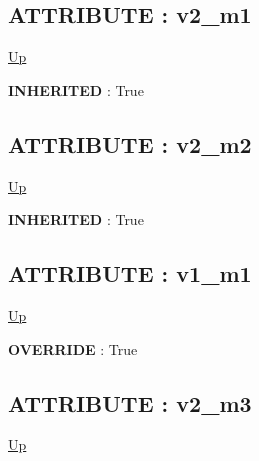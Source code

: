 \subsection*{ATTRIBUTE : v2\_m1}
\hypertarget{ecldoc:intest.inintest.example_2.mod_1.v2_m1}{}
\par
\begin{minipage}[t]{\textwidth}
\begin{flushleft}
  
\end{flushleft}
\end{minipage}
\hyperlink{ecldoc:intest.inintest.example_2.mod_3}{Up} \\
\par
\par
\textbf{INHERITED} : True \\
\subsection*{ATTRIBUTE : v2\_m2}
\hypertarget{ecldoc:intest.inintest.example_2.mod_2.v2_m2}{}
\par
\begin{minipage}[t]{\textwidth}
\begin{flushleft}
  
\end{flushleft}
\end{minipage}
\hyperlink{ecldoc:intest.inintest.example_2.mod_3}{Up} \\
\par
\par
\textbf{INHERITED} : True \\
\subsection*{ATTRIBUTE : v1\_m1}
\hypertarget{ecldoc:intest.inintest.example_2.mod_3.v1_m1}{}
\par
\begin{minipage}[t]{\textwidth}
\begin{flushleft}
  
\end{flushleft}
\end{minipage}
\hyperlink{ecldoc:intest.inintest.example_2.mod_3}{Up} \\
\par
\par
\textbf{OVERRIDE} : True \\
\subsection*{ATTRIBUTE : v2\_m3}
\hypertarget{ecldoc:intest.inintest.example_2.mod_3.v2_m3}{}
\par
\begin{minipage}[t]{\textwidth}
\begin{flushleft}
  
\end{flushleft}
\end{minipage}
\hyperlink{ecldoc:intest.inintest.example_2.mod_3}{Up} \\
\par
\par

